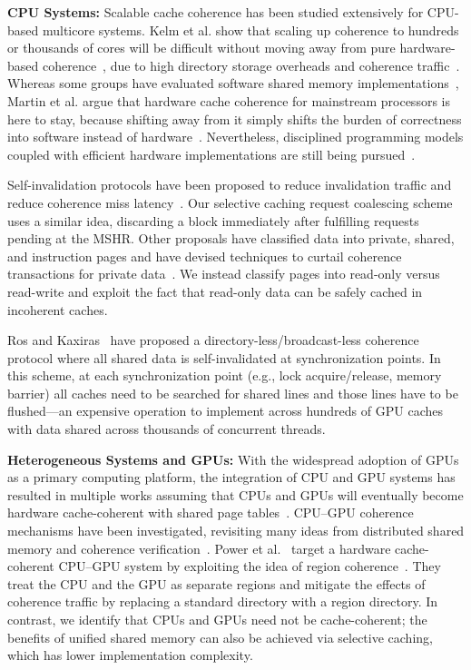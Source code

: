 \textbf{CPU Systems:} Scalable cache coherence has been studied extensively for CPU-based
 multicore systems. Kelm et al. show that scaling up coherence to hundreds
or thousands of cores will be difficult without moving away from pure
hardware-based coherence~\cite{Kelm2009,Hill92}, due to high directory storage
overheads and coherence traffic~\cite{Lebeck95,Cheng06}.  
Whereas some groups have
evaluated software shared memory implementations~\cite{Falsafi94,Hill92}, Martin
et al. argue that hardware cache coherence for mainstream processors is here to
stay, because shifting away from it simply shifts the burden of correctness into
software instead of hardware~\cite{Martin2012}. Nevertheless, disciplined programming
models coupled with efficient hardware implementations are still being pursued~\cite{choi2011,Sung2013,Sung2015}.

Self-invalidation protocols have been proposed to reduce invalidation traffic and reduce
coherence miss latency~\cite{Lebeck95,Lai2000}. Our selective caching request coalescing scheme uses a similar idea,
discarding a block immediately after fulfilling requests pending at the MSHR.
Other proposals have classified data into private, shared, and
instruction pages and have devised techniques to curtail coherence transactions
for private data~\cite{Pugsley2010,Hardavellas2009,Cuesta2011,Ros2012}. We instead classify
pages into read-only versus read-write and exploit the fact that read-only data
can be safely cached in incoherent caches.

Ros and Kaxiras~\cite{Ros2012} have proposed a
directory\hyp{}less\slash{}broadcast\hyp{}less coherence protocol where all shared
data is self\hyp{}invalidated at synchronization points. In this scheme,
at each synchronization point (e.g., lock acquire/release, memory barrier) all
caches need to be searched for shared lines and those lines have to be
flushed---an expensive operation to implement across hundreds of GPU caches with data
shared across thousands of concurrent threads.

\textbf{Heterogeneous Systems and GPUs:} With the widespread adoption of GPUs as a primary
computing platform, the integration of CPU and GPU systems has
resulted in multiple works assuming that CPUs and GPUs will eventually become
hardware cache-coherent with shared page
tables~\cite{power2014,Pichai2014,Agarwal2015,Agarwal2015b}.  CPU--GPU coherence
mechanisms have been investigated, revisiting many ideas from distributed shared
memory and coherence verification~\cite{Gelado2010,wu2014,Kaxiras2013}. Power et
al.~\cite{Power2013} target a hardware cache-coherent CPU--GPU system by
exploiting the idea of region
coherence~\cite{Cantin2005,Alisafaee2012,Moshovos2005,Zebchuk2007}. They treat the CPU and the
GPU as separate regions and mitigate the effects of coherence traffic by
replacing a standard directory with a region directory. 
In contrast, we identify that CPUs and GPUs need not be cache-coherent; 
the benefits of unified shared memory can also be achieved via selective caching, which has lower
implementation complexity.

